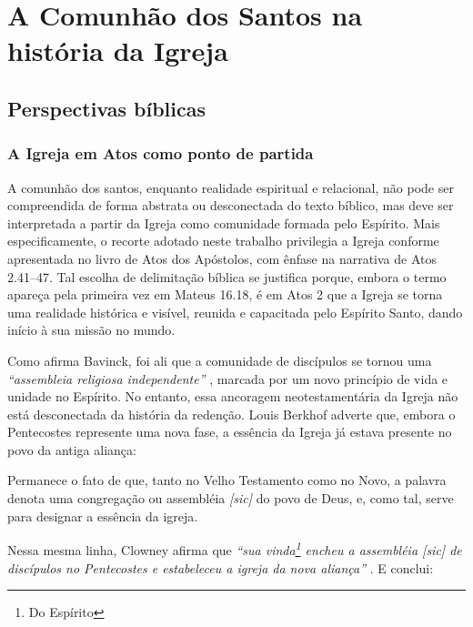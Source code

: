 \chapter{A Comunhão dos Santos na história da Igreja}

\section{Perspectivas bíblicas}

\subsection{A Igreja em Atos como ponto de partida}

A comunhão dos santos, enquanto realidade espiritual e relacional, não pode ser compreendida de forma abstrata ou desconectada do texto bíblico, mas deve ser interpretada a partir da Igreja como comunidade formada pelo Espírito. Mais especificamente, o recorte adotado neste trabalho privilegia a Igreja conforme apresentada no livro de Atos dos Apóstolos, com ênfase na narrativa de Atos 2.41–47. Tal escolha de delimitação bíblica se justifica porque, embora o termo \textit{} apareça pela primeira vez em Mateus 16.18, é em Atos 2 que a Igreja se torna uma realidade histórica e visível, reunida e capacitada pelo Espírito Santo, dando início à sua missão no mundo.

Como afirma Bavinck, foi ali que a comunidade de discípulos se tornou uma \textit{``assembleia religiosa independente''} \cite[p.~284]{bavinck2012}, marcada por um novo princípio de vida e unidade no Espírito. No entanto, essa ancoragem neotestamentária da Igreja não está desconectada da história da redenção. Louis Berkhof adverte que, embora o Pentecostes represente uma nova fase, a essência da Igreja já estava presente no povo da antiga aliança:

\begin{citacao}
    Permanece o fato de que, tanto no Velho Testamento como no Novo, a palavra denota uma congregação ou assembléia \textit{[sic]} do povo de Deus, e, como tal, serve para designar a essência da igreja. \cite[p.~650]{berkhof2012}
\end{citacao}

Nessa mesma linha, Clowney afirma que \textit{``sua vinda\footnote{Do Espírito} encheu a assembléia [sic] de discípulos no Pentecostes e estabeleceu a igreja da nova aliança''} \cite[p.~24]{clowney2007}. E conclui:

